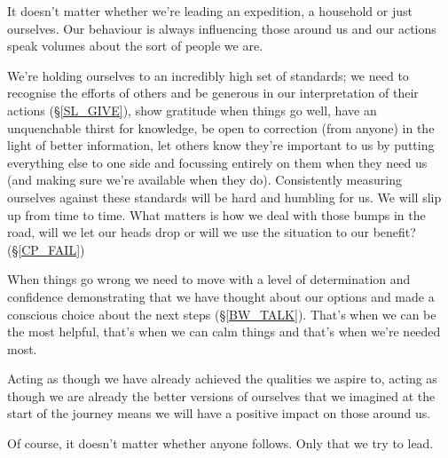 \cleardoublepage
\begin{multicols}{2}

It doesn't matter whether we're leading an expedition, a household or just ourselves. Our behaviour is always influencing those around us and our actions speak volumes about the sort of people we are.

We're holding ourselves to an incredibly high set of standards; we need to recognise the efforts of others and be generous in our interpretation of their actions (\S \ref{SL_GIVE}), show gratitude when things go well, have an unquenchable thirst for knowledge, be open to correction (from anyone) in the light of better information, let others know they're important to us by putting everything else to one side and focussing entirely on them when they need us (and making sure we're available when they do). Consistently measuring ourselves against these standards will be hard and humbling for us. We will slip up from time to time. What matters is how we deal with those bumps in the road, will we let our heads drop or will we use the situation to our benefit? (\S \ref{CP_FAIL})

When things go wrong we need to move with a level of determination and confidence demonstrating that we have thought about our options and made a conscious choice about the next steps (\S \ref{BW_TALK}). That's when we can be the most helpful, that's when we can calm things and that's when we're needed most.

Acting as though we have already achieved the qualities we aspire to, acting as though we are already the better versions of ourselves that we imagined at the start of the journey means we will have a positive impact on those around us.

Of course, it doesn't matter whether anyone follows. Only that we try to lead.

\end{multicols}
\clearpage
